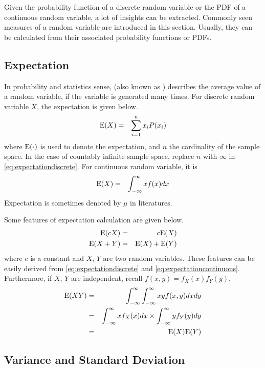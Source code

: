 Given the probability function of a discrete random variable or the PDF of a continuous random variable, a lot of insights can be extracted. Commonly seen measures of a random variable are introduced in this section. Usually, they can be calculated from their associated probability functions or PDFs.

\subsection{Expectation}

In probability and statistics sense,  (also known as ) describes the average value of a random variable, if the variable is generated many times. For discrete random variable $X$, the expectation is given below.
\begin{eqnarray}
	\textup{E}(X) &=& \sum_{i=1}^{n}x_iP(x_i) \label{eq:expectationdiscrete}
\end{eqnarray}
where $\textup{E}(\cdot)$ is used to denote the expectation, and $n$ the cardinality of the sample space. In the case of countably infinite sample space, replace $n$ with $\infty$ in \eqref{eq:expectationdiscrete}. For continuous random variable, it is
\begin{eqnarray}
	\textup{E}(X) &=& \int_{-\infty}^{\infty}xf(x)dx \label{eq:expectationcontinuous}
\end{eqnarray}
Expectation is sometimes denoted by $\mu$ in literatures.

Some features of expectation calculation are given below.
\begin{eqnarray}
	\textup{E}(cX) &=& c\textup{E}(X) \nonumber \\
	\textup{E}(X+Y) &=& \textup{E}(X) + \textup{E}(Y) \nonumber
\end{eqnarray}
where $c$ is a constant and $X$, $Y$ are two random variables. These features can be easily derived from \eqref{eq:expectationdiscrete} and \eqref{eq:expectationcontinuous}. Furthermore, if $X$, $Y$ are independent, recall $f(x,y) = f_X(x)f_Y(y)$,
\begin{eqnarray}
	\textup{E}(XY) &=& \int_{-\infty}^{\infty}\int_{-\infty}^{\infty} xyf(x, y)dxdy \nonumber \\
	&=& \int_{-\infty}^{\infty}xf_X(x)dx \times \int_{-\infty}^{\infty}yf_Y(y)dy \nonumber \\
	&=& \textup{E}(X)\textup{E}(Y) \nonumber
\end{eqnarray}

\subsection{Variance and Standard Deviation}

